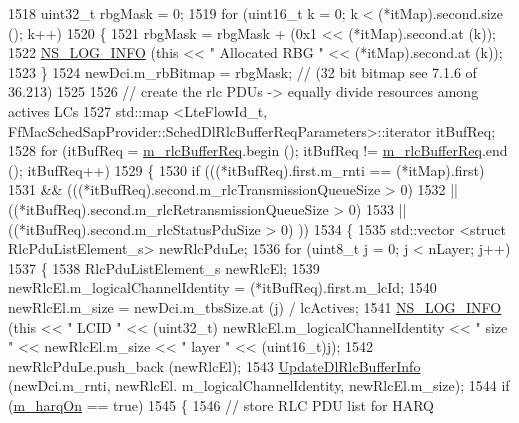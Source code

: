 \begin{DoxyCode}
1518       uint32\_t rbgMask = 0;
1519       \textcolor{keywordflow}{for} (uint16\_t k = 0; k < (*itMap).second.size (); k++)
1520         \{
1521           rbgMask = rbgMask + (0x1 << (*itMap).second.at (k));
1522           \hyperlink{group__logging_gafbd73ee2cf9f26b319f49086d8e860fb}{NS\_LOG\_INFO} (\textcolor{keyword}{this} << \textcolor{stringliteral}{" Allocated RBG "} << (*itMap).second.at (k));
1523         \}
1524       newDci.m\_rbBitmap = rbgMask; \textcolor{comment}{// (32 bit bitmap see 7.1.6 of 36.213)}
1525 
1526       \textcolor{comment}{// create the rlc PDUs -> equally divide resources among actives LCs}
1527       std::map <LteFlowId\_t, FfMacSchedSapProvider::SchedDlRlcBufferReqParameters>::iterator itBufReq;
1528       \textcolor{keywordflow}{for} (itBufReq = \hyperlink{classns3_1_1FdTbfqFfMacScheduler_a1de1056077db96c215eb47ef724e1167}{m\_rlcBufferReq}.begin (); itBufReq != 
      \hyperlink{classns3_1_1FdTbfqFfMacScheduler_a1de1056077db96c215eb47ef724e1167}{m\_rlcBufferReq}.end (); itBufReq++)
1529         \{
1530           \textcolor{keywordflow}{if} (((*itBufReq).first.m\_rnti == (*itMap).first)
1531               && (((*itBufReq).second.m\_rlcTransmissionQueueSize > 0)
1532                   || ((*itBufReq).second.m\_rlcRetransmissionQueueSize > 0)
1533                   || ((*itBufReq).second.m\_rlcStatusPduSize > 0) ))
1534             \{
1535               std::vector <struct RlcPduListElement\_s> newRlcPduLe;
1536               \textcolor{keywordflow}{for} (uint8\_t j = 0; j < nLayer; j++)
1537                 \{
1538                   RlcPduListElement\_s newRlcEl;
1539                   newRlcEl.m\_logicalChannelIdentity = (*itBufReq).first.m\_lcId;
1540                   newRlcEl.m\_size = newDci.m\_tbsSize.at (j) / lcActives;
1541                   \hyperlink{group__logging_gafbd73ee2cf9f26b319f49086d8e860fb}{NS\_LOG\_INFO} (\textcolor{keyword}{this} << \textcolor{stringliteral}{" LCID "} << (uint32\_t) newRlcEl.m\_logicalChannelIdentity 
      << \textcolor{stringliteral}{" size "} << newRlcEl.m\_size << \textcolor{stringliteral}{" layer "} << (uint16\_t)j);
1542                   newRlcPduLe.push\_back (newRlcEl);
1543                   \hyperlink{classns3_1_1FdTbfqFfMacScheduler_a5c2d153f27717df1f7c8627a387c337f}{UpdateDlRlcBufferInfo} (newDci.m\_rnti, newRlcEl.
      m\_logicalChannelIdentity, newRlcEl.m\_size);
1544                   \textcolor{keywordflow}{if} (\hyperlink{classns3_1_1FdTbfqFfMacScheduler_afb4bf57d3b17b967f82a5b2134cd70e7}{m\_harqOn} == \textcolor{keyword}{true})
1545                     \{
1546                       \textcolor{comment}{// store RLC PDU list for HARQ}

\end{DoxyCode}
